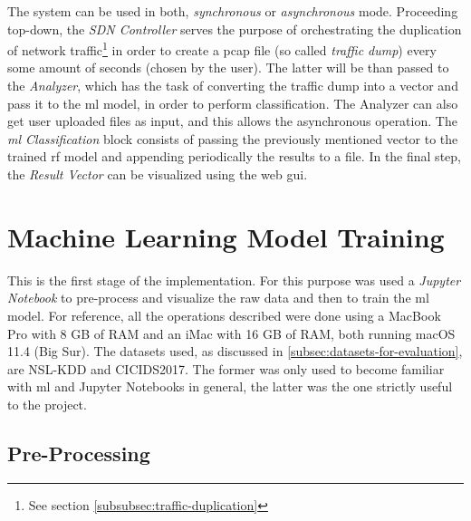 \noindent The system can be used in both, \textit{synchronous} or \textit{asynchronous} mode. Proceeding top-down, the \textit{SDN Controller} serves the purpose of orchestrating the duplication of network traffic\footnote{See section \ref{subsubsec:traffic-duplication}} in order to create a \gls{pcap} file (so called \textit{traffic dump}) every some amount of seconds (chosen by the user). The latter will be than passed to the \textit{Analyzer}, which has the task of converting the traffic dump into a vector and pass it to the \gls{ml} model, in order to perform classification. The Analyzer can also get user uploaded files as input, and this allows the asynchronous operation. The \textit{\gls{ml} Classification} block consists of passing the previously mentioned vector to the trained \gls{rf} model and appending periodically the results to a  file. In the final step, the \textit{Result Vector} can be visualized using the web \gls{gui}.


\section{Machine Learning Model Training}
\label{sec:model-training}

This is the first stage of the implementation. For this purpose was used a \textit{Jupyter Notebook} to pre-process and visualize the raw data and then to train the \gls{ml} model. For reference, all the operations described were done using a MacBook Pro with 8 GB of RAM and an iMac with 16 GB of RAM, both running macOS 11.4 (Big Sur). The datasets used, as discussed in \ref{subsec:datasets-for-evaluation}, are NSL-KDD and CICIDS2017. The former was only used to become familiar with \gls{ml} and Jupyter Notebooks in general, the latter was the one strictly useful to the project.


\subsection{Pre-Processing}
\label{subsec:pre-processing}

